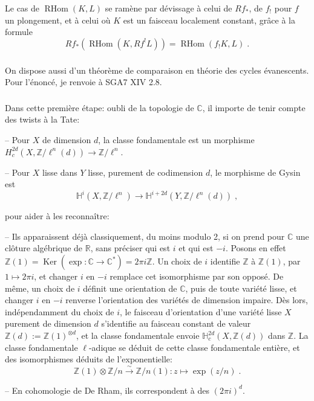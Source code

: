 \documentclass[12pt,a4paper]{article}
\theoremstyle{plain}
\theoremstyle{definition}
\theoremstyle{remark}
\DeclareMathOperator{\Ker}{Ker}
\DeclareMathOperator{\RHom}{RHom}
\newcommand{\CC}{\mathbb{C}}
\newcommand{\HH}{\mathbb{H}}
\newcommand{\RR}{\mathbb{R}}
\newcommand{\ZZ}{\mathbb{Z}}
\begin{document}
Le cas de $\RHom(K, L)$ se ram\`ene par d\'evissage \`a celui de $Rf_*$, de $f_!$ pour $f$ un plongement, et \`a celui o\`u $K$ est un faisceau localement constant, gr\^ace \`a la formule
\[
Rf_*(\RHom(K, Rf^!L)) = \RHom(f_!K, L)\;.
\]

\subsubsection{}
On dispose aussi d'un th\'eor\`eme de comparaison en th\'eorie des cycles \'evanescents. Pour l'\'enonc\'e, je renvoie \`a SGA7 XIV 2.8.

\subsubsection{}
Dans cette premi\`ere \'etape: oubli de la topologie de $\CC$, il importe de tenir compte des twists \`a la Tate:

-- Pour $X$ de dimension $d$, la classe fondamentale est un morphisme $H^{2d}_c(X, \ZZ/\ell^n(d)) \longrightarrow \ZZ/\ell^n$.

-- Pour $X$ lisse dans $Y$ lisse, purement de codimension $d$, le morphisme de Gysin est
\[
\HH^i(X, \ZZ/\ell^n) \longrightarrow \HH^{i+2d}(Y, \ZZ/\ell^n(d))\;,
\]

pour aider \`a les reconna\^itre:

-- Ils apparaissent d\'ej\`a classiquement, du moins modulo 2, si on prend pour $\CC$ une cl\^oture alg\'ebrique de $\RR$, sans pr\'eciser qui est $i$ et qui est $-i$. Posons en effet $\ZZ(1) = \Ker(\exp: \CC \to \CC^*) = 2\pi i \ZZ$. Un choix de $i$ identifie $\ZZ$ \`a $\ZZ(1)$, par $1 \longmapsto 2\pi i$, et changer $i$ en $-i$ remplace cet isomorphisme par son oppos\'e. De m\^eme, un choix de $i$ d\'efinit une orientation de $\CC$, puis de toute vari\'et\'e lisse, et changer $i$ en $-i$ renverse l'orientation des vari\'et\'es de dimension impaire. D\`es lors, ind\'ependamment du choix de $i$, le faisceau d'orientation d'une vari\'et\'e lisse $X$ purement de dimension $d$ s'identifie au faisceau constant de valeur $\ZZ(d) := \ZZ(1)^{\otimes d}$, et la classe fondamentale envoie $\HH^{2d}_c(X, \ZZ(d))$ dans $\ZZ$. La classe fondamentale $\ell$-adique se d\'eduit de cette classe fondamentale enti\`ere, et des isomorphismes d\'eduits de l'exponentielle:
\[
\ZZ(1) \otimes \ZZ/n \xrightarrow{\sim} \ZZ/n(1): z \longmapsto \exp(z/n)\;.
\]

-- En cohomologie de De Rham, ils correspondent \`a des $(2\pi i)^d$.
\end{document}
